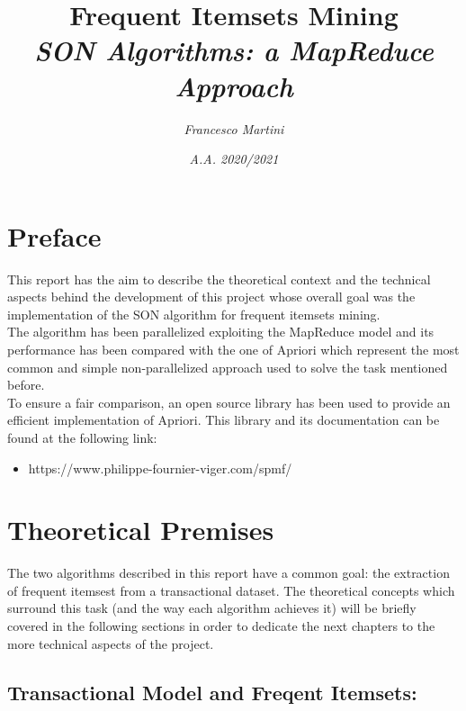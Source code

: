 \documentclass[]{report}
\title{\huge \textbf{Frequent Itemsets Mining} 
	\\ \LARGE \textit{SON Algorithms: a MapReduce Approach}}
\author{\textit{Francesco Martini}}
\date{\textit{A.A. 2020/2021}}
\begin{document}
\maketitle
\chapter*{\huge Preface}

	This report has the aim to describe the theoretical context and the technical aspects behind the development of this project whose overall goal was the implementation of the SON algorithm for frequent itemsets mining. \\
	The algorithm has been parallelized exploiting the MapReduce model and its performance has been compared with the one of Apriori which represent the most common and simple non-parallelized approach used to solve the task mentioned before. \\
	To ensure a fair comparison, an open source library has been used to provide an efficient implementation of Apriori.
	This library and its documentation can be found at the following link:
	
	\begin{itemize}
		\item https://www.philippe-fournier-viger.com/spmf/
	\end{itemize}     

\chapter*{\huge Theoretical Premises}

	The two algorithms described in this report have a common goal: the extraction of frequent itemsest from a transactional dataset.
	The theoretical concepts which surround this task (and the way each algorithm achieves it) will be briefly covered in the following sections in order to dedicate the next chapters to the more technical aspects of the project.     

\section*{Transactional Model and Freqent Itemsets:}
	
\end{document}
